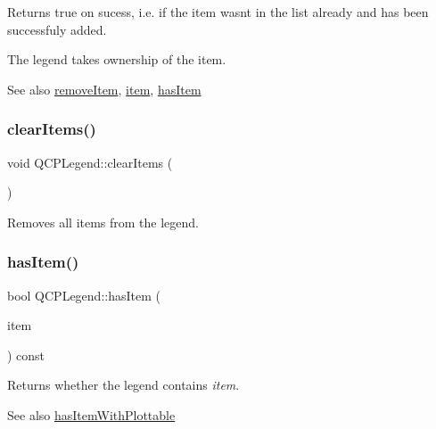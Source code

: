 Returns true on sucess, i.\+e. if the item wasn\textquotesingle{}t in the list already and has been successfuly added.

The legend takes ownership of the item.

\begin{DoxySeeAlso}{See also}
\mbox{\hyperlink{class_q_c_p_legend_ac91595c3eaa746fe6321d2eb952c63bb}{remove\+Item}}, \mbox{\hyperlink{class_q_c_p_legend_acfe9694c45104a3359d3806ed366fcf7}{item}}, \mbox{\hyperlink{class_q_c_p_legend_ad0f698e33db454a6c103b5206740e599}{has\+Item}} 
\end{DoxySeeAlso}
\mbox{\label{class_q_c_p_legend_a24795c7250eb5214fcea16b7217b4dfb}} 
\subsubsection{\texorpdfstring{clear\+Items()}{clearItems()}}
{\footnotesize\ttfamily void Q\+C\+P\+Legend\+::clear\+Items (\begin{DoxyParamCaption}{ }\end{DoxyParamCaption})}

Removes all items from the legend. \mbox{\label{class_q_c_p_legend_ad0f698e33db454a6c103b5206740e599}} 
\subsubsection{\texorpdfstring{has\+Item()}{hasItem()}}
{\footnotesize\ttfamily bool Q\+C\+P\+Legend\+::has\+Item (\begin{DoxyParamCaption}\item[{\mbox{\hyperlink{class_q_c_p_abstract_legend_item}{Q\+C\+P\+Abstract\+Legend\+Item}} $\ast$}]{item }\end{DoxyParamCaption}) const}

Returns whether the legend contains {\itshape item}.

\begin{DoxySeeAlso}{See also}
\mbox{\hyperlink{class_q_c_p_legend_a4b90a442af871582df85c2bc13f91e88}{has\+Item\+With\+Plottable}} 
\end{DoxySeeAlso}
\mbox{\label{class_q_c_p_legend_a4b90a442af871582df85c2bc13f91e88}} 
